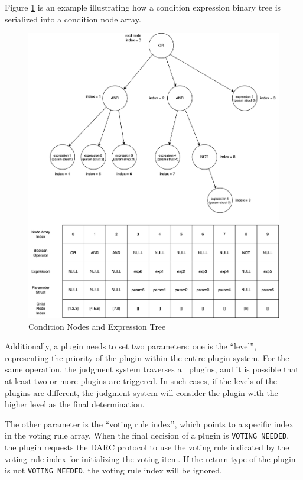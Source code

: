 \documentclass[main.tex]{subfiles}
\begin{document}
Figure \ref{fig:condition-nodes} is an example illustrating how a condition expression binary tree is serialized into a condition node array.

\begin{figure}
\centering
\includegraphics[width=1\linewidth]{plugin_condition_nodes.drawio.png}
\caption{\label{fig:condition-nodes}Condition Nodes and Expression Tree}
\end{figure}

Additionally, a plugin needs to set two parameters: one is the ``level'', representing the priority of the plugin within the entire plugin system. For the same operation, the judgment system traverses all plugins, and it is possible that at least two or more plugins are triggered. In such cases, if the levels of the plugins are different, the judgment system will consider the plugin with the higher level as the final determination.

The other parameter is the ``voting rule index'', which points to a specific index in the voting rule array. When the final decision of a plugin is \texttt{VOTING\_NEEDED}, the plugin requests the DARC protocol to use the voting rule indicated by the voting rule index for initializing the voting item. If the return type of the plugin is not \texttt{VOTING\_NEEDED}, the voting rule index will be ignored.
\end{document}
